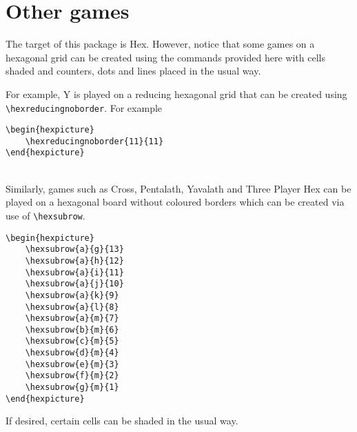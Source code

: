 \documentclass[a4paper,12pt]{article}
\begin{document}
    \section{Other games}
    
    The target of this package is Hex. However, notice that some games on a hexagonal grid can be created using the commands provided here with cells shaded and counters, dots and lines placed in the usual way.
    
    For example, Y is played on a reducing hexagonal grid that can be created using \verb|\hexreducingnoborder|. For example
    
    \begin{verbatim}\begin{hexpicture}
    \hexreducingnoborder{11}{11}
\end{hexpicture}\end{verbatim}
    
    \begin{hexpicture}
    \end{hexpicture}\\

    Similarly, games such as Cross, Pentalath, Yavalath and Three Player Hex can be played on a hexagonal board without coloured borders which can be created via use of \verb|\hexsubrow|.
    
    \begin{verbatim}\begin{hexpicture}
    \hexsubrow{a}{g}{13}
    \hexsubrow{a}{h}{12}
    \hexsubrow{a}{i}{11}
    \hexsubrow{a}{j}{10}
    \hexsubrow{a}{k}{9}
    \hexsubrow{a}{l}{8}
    \hexsubrow{a}{m}{7}
    \hexsubrow{b}{m}{6}
    \hexsubrow{c}{m}{5}
    \hexsubrow{d}{m}{4}
    \hexsubrow{e}{m}{3}
    \hexsubrow{f}{m}{2}
    \hexsubrow{g}{m}{1}
\end{hexpicture}\end{verbatim}
    
    \begin{hexpicture}
    \end{hexpicture}

    If desired, certain cells can be shaded in the usual way. 
    
\end{document}
